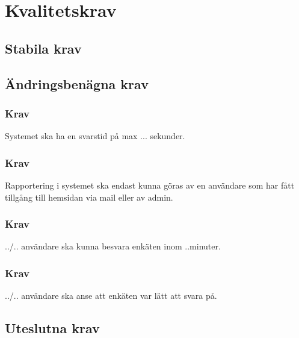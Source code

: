 \documentclass{article}
\begin{document}
    \section{Kvalitetskrav}
    \subsection{Stabila krav}
  
     \subsection{Ändringsbenägna krav}
     
     \subsubsection{Krav}
    Systemet ska ha en svarstid på max ... sekunder.
    
    \subsubsection{Krav}
    Rapportering i systemet ska endast kunna göras av en användare som har fått tillgång till hemsidan via mail eller av admin.
    
     \subsubsection{Krav}
    ../.. användare ska kunna besvara enkäten inom ..minuter.
    
    \subsubsection{Krav}
    ../.. användare ska anse att enkäten var lätt att svara på.
    
    \subsection{Uteslutna krav}

\end{document}
